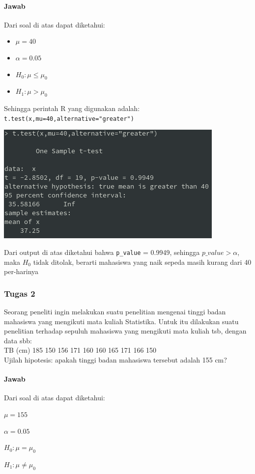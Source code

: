 \documentclass[a4paper,12pt]{article}
\begin{document}
\paragraph{Jawab\\}
Dari soal di atas dapat diketahui:
\begin{itemize}
    \item $\mu = 40$
    \item $\alpha = 0.05$
    \item $H_{0} : \mu \leq \mu_{0}$
    \item $H_{1} : \mu > \mu_{0}$
\end{itemize}
Sehingga perintah R yang digunakan adalah:\\
\texttt{t.test(x,mu=40,alternative="greater")}\\
\begin{center}
    \includegraphics[width=0.8\linewidth]{tugas1.png}
\end{center}
Dari output di atas diketahui bahwa \texttt{p\_value} = 0.9949, sehingga $p\_value > \alpha$, maka $H_{0}$ tidak ditolak, berarti mahasiswa yang naik sepeda masih kurang dari 40 per-harinya

\subsubsection{Tugas 2}
Seorang peneliti ingin melakukan suatu penelitian mengenai tinggi badan mahasiswa yang mengikuti mata kuliah Statistika. Untuk itu dilakukan suatu penelitian terhadap sepuluh mahasiswa yang mengikuti mata kuliah tsb, dengan data sbb:\\
TB (cm) 185 150 156 171 160 160 165 171 166 150\\ 
Ujilah hipotesis: apakah tinggi badan mahasiswa tersebut adalah 155 cm?

\paragraph{Jawab\\}
Dari soal di atas dapat diketahui:
\begin{center}
    \item $\mu = 155$
    \item $\alpha = 0.05$
    \item $H_{0} : \mu = \mu_{0}$
    \item $H_{1} : \mu \neq \mu_{0}$
\end{center}
\end{document}
